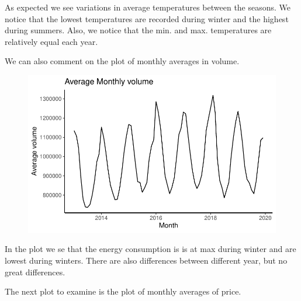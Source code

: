 \documentclass[
  letterpaper,
  DIV=11,
  numbers=noendperiod]{scrartcl}
\newenvironment{Shaded}{\begin{snugshade}}{\end{snugshade}}
\newcommand{\CommentTok}[1]{\textcolor[rgb]{0.37,0.37,0.37}{#1}}
\newcommand{\NormalTok}[1]{\textcolor[rgb]{0.00,0.23,0.31}{#1}}
\newcommand{\SpecialCharTok}[1]{\textcolor[rgb]{0.37,0.37,0.37}{#1}}
\begin{document}
As expected we see variations in average temperatures between the
seasons. We notice that the lowest temperatures are recorded during
winter and the highest during summers. Also, we notice that the min. and
max. temperatures are relatively equal each year.

We can also comment on the plot of monthly averages in volume.

\begin{Shaded}
\end{Shaded}

\begin{figure}[H]

{\centering \includegraphics{Assignment2_files/figure-pdf/unnamed-chunk-6-1.pdf}

}

\end{figure}

In the plot we se that the energy consumption is is at max during winter
and are lowest during winters. There are also differences between
different year, but no great differences.

The next plot to examine is the plot of monthly averages of price.

\begin{Shaded}
\end{Shaded}
\end{document}
